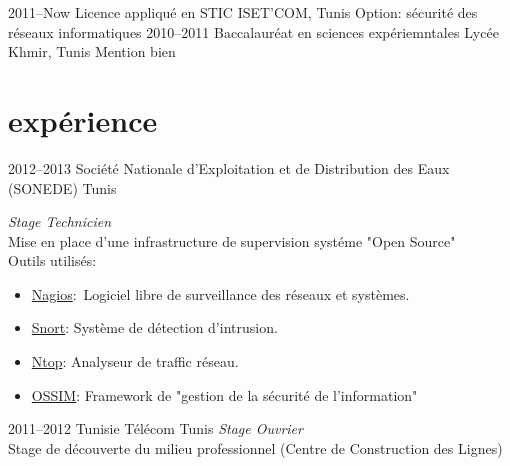 \documentclass[]{friggeri-cv}
\begin{document}
\begin{entrylist}
\entry
{2011--Now}
{Licence {\normalfont appliqué en STIC}}
{ISET'COM, Tunis}
{Option: sécurité des réseaux informatiques}
\entry
{2010--2011}
{Baccalauréat {\normalfont en sciences expériemntales}}
{Lycée Khmir, Tunis}
{Mention bien}
\end{entrylist}


\section{expérience}

\begin{entrylist}
\entry
{2012--2013}
{Société Nationale d’Exploitation et de Distribution des Eaux (SONEDE)}
{Tunis}
{\emph{Stage Technicien} \\
Mise en place d’une infrastructure de supervision systéme "Open Source"\\
Outils utilisés:
\begin{itemize}
\item \href{www.nagios.org/}{Nagios}:~Logiciel libre de surveillance des réseaux et systèmes.
\item \href{https://www.snort.org/}{Snort}: Système de détection d'intrusion.
\item \href{www.ntop.org/}{Ntop}: Analyseur de traffic réseau.
\item \href {https://www.alienvault.com}{OSSIM}: Framework de "gestion de la sécurité de l’information"
\end{itemize}}
\entry
{2011--2012}
{Tunisie Télécom}
{Tunis}
{\emph{Stage Ouvrier} \\
Stage de découverte du milieu professionnel (Centre de Construction des Lignes)}
\end{entrylist}

\end{document}
